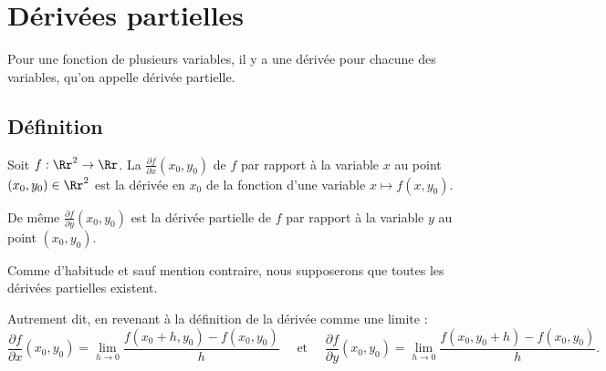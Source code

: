 \documentclass[11pt,class=report,crop=false]{standalone}
\begin{document}




\section{Dérivées partielles}

Pour une fonction de plusieurs variables, il y a une dérivée pour chacune des variables, qu'on appelle dérivée partielle. 

\subsection{Définition}


\begin{definition}
Soit $f : \Rr^2 \to \Rr$. 
La  $\frac{\partial f}{\partial x} (x_0,y_0)$ de $f$ par rapport à la variable $x$ au point $(x_0,y_0) \in \Rr^2$ est la dérivée en $x_0$ de 
la fonction d'une variable $x \mapsto f(x, y_0)$.

De même $\frac{\partial f}{\partial y} (x_0,y_0)$ est la dérivée partielle de $f$ par rapport à la variable $y$ au point $(x_0,y_0)$.


\end{definition}

Comme d'habitude et sauf mention contraire, nous supposerons que toutes les dérivées partielles existent.

Autrement dit, en revenant à la définition de la dérivée comme une limite :
 $$\frac{\partial f}{\partial x} (x_0,y_0) = \lim_{h \rightarrow 0} 
 \frac{f(x_0+h, y_0) - f(x_0,y_0)}{h}
\quad \text{ et } \quad 
\frac{\partial f}{\partial y} (x_0,y_0) = \lim_{h \rightarrow 0} 
 \frac{f(x_0, y_0+h) - f(x_0,y_0)}{h}.$$
\end{document}
